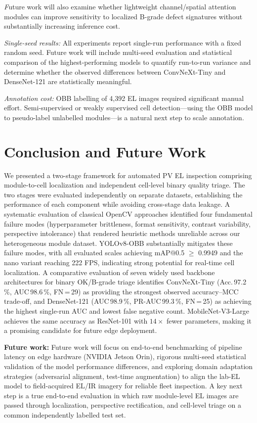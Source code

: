 \documentclass[conference]{IEEEtran}
\begin{document}
\textit Future work will also examine whether lightweight channel/spatial attention modules can improve sensitivity to localized B-grade defect signatures without substantially increasing inference cost.

\textit{Single-seed results:} All experiments report single-run performance with a fixed random seed. Future work will include multi-seed evaluation and statistical comparison of the highest-performing models to quantify run-to-run variance and determine whether the observed differences between ConvNeXt-Tiny and DenseNet-121 are statistically meaningful.

\textit{Annotation cost:} OBB labelling of 4{,}392 EL images required significant manual effort. Semi-supervised or weakly supervised cell detection---using the OBB model to pseudo-label unlabelled modules---is a natural next step to scale annotation.

\section{Conclusion and Future Work}
\label{sec:conclusion}

We presented a two-stage framework for automated PV EL inspection comprising module-to-cell localization and independent cell-level binary quality triage. The two stages were evaluated independently on separate datasets, establishing the performance of each component while avoiding cross-stage data leakage. A systematic evaluation of classical OpenCV approaches identified four fundamental failure modes (hyperparameter brittleness, format sensitivity, contrast variability, perspective intolerance) that rendered heuristic methods unreliable across our heterogeneous module dataset. YOLOv8-OBB substantially mitigates these failure modes, with all evaluated scales achieving mAP@0.5 $\geq$ 0.9949 and the nano variant reaching 222 FPS, indicating strong potential for real-time cell localization. A comparative evaluation of seven widely used backbone architectures for binary OK/B-grade triage identifies ConvNeXt-Tiny (Acc.\,97.2\,\%, AUC\,98.6\,\%, FN\,=\,29) as providing the strongest observed accuracy--MCC trade-off, and DenseNet-121 (AUC\,98.9\,\%, PR-AUC\,99.3\,\%, FN\,=\,25) as achieving the highest single-run AUC and lowest false negative count. MobileNet-V3-Large achieves the same accuracy as ResNet-101 with $14\times$ fewer parameters, making it a promising candidate for future edge deployment.

\textbf{Future work:} Future work will focus on end-to-end benchmarking of pipeline latency on edge hardware (NVIDIA Jetson Orin), rigorous multi-seed statistical validation of the model performance differences, and exploring domain adaptation strategies (adversarial alignment, test-time augmentation) to align the lab-EL model to field-acquired EL/IR imagery for reliable fleet inspection. A key next step is a true end-to-end evaluation in which raw module-level EL images are passed through localization, perspective rectification, and cell-level triage on a common independently labelled test set.



\end{document}
